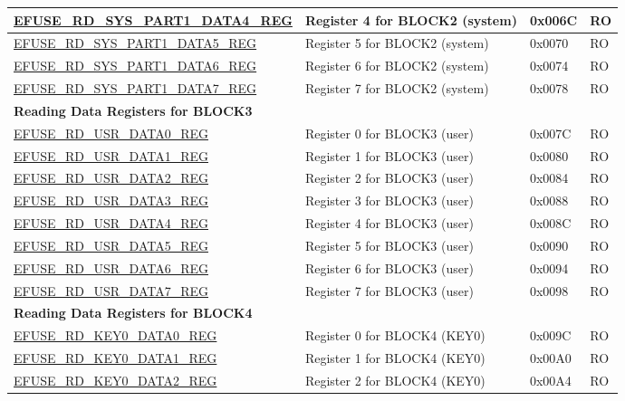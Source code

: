 \begin{longtable}{ | p{7.2cm} | p{6cm} | p{1.3cm} | p{1cm} | }
\hyperref[regdesc:EFUSERDSYSPART1DATA4TO7REG]{EFUSE\_RD\_SYS\_PART1\_DATA4\_REG} & Register 4 for BLOCK2 (system) & 0x006C & RO \\ \hline
\hyperref[regdesc:EFUSERDSYSPART1DATA4TO7REG]{EFUSE\_RD\_SYS\_PART1\_DATA5\_REG} & Register 5 for BLOCK2 (system) & 0x0070 & RO \\ \hline
\hyperref[regdesc:EFUSERDSYSPART1DATA4TO7REG]{EFUSE\_RD\_SYS\_PART1\_DATA6\_REG} & Register 6 for BLOCK2 (system) & 0x0074 & RO \\ \hline
\hyperref[regdesc:EFUSERDSYSPART1DATA4TO7REG]{EFUSE\_RD\_SYS\_PART1\_DATA7\_REG} & Register 7 for BLOCK2 (system) & 0x0078 & RO \\ \hline
\multicolumn{4}{|l|}{\textbf{Reading Data Registers for BLOCK3}} \\ \hline
\hyperref[regdesc:EFUSERDUSRDATANREG]{EFUSE\_RD\_USR\_DATA0\_REG} & Register 0 for BLOCK3 (user) & 0x007C & RO \\ \hline
\hyperref[regdesc:EFUSERDUSRDATANREG]{EFUSE\_RD\_USR\_DATA1\_REG} & Register 1 for BLOCK3 (user) & 0x0080 & RO \\ \hline
\hyperref[regdesc:EFUSERDUSRDATANREG]{EFUSE\_RD\_USR\_DATA2\_REG} & Register 2 for BLOCK3 (user) & 0x0084 & RO \\ \hline
\hyperref[regdesc:EFUSERDUSRDATANREG]{EFUSE\_RD\_USR\_DATA3\_REG} & Register 3 for BLOCK3 (user) & 0x0088 & RO \\ \hline
\hyperref[regdesc:EFUSERDUSRDATANREG]{EFUSE\_RD\_USR\_DATA4\_REG} & Register 4 for BLOCK3 (user) & 0x008C & RO \\ \hline
\hyperref[regdesc:EFUSERDUSRDATANREG]{EFUSE\_RD\_USR\_DATA5\_REG} & Register 5 for BLOCK3 (user) & 0x0090 & RO \\ \hline
\hyperref[regdesc:EFUSERDUSRDATANREG]{EFUSE\_RD\_USR\_DATA6\_REG} & Register 6 for BLOCK3 (user) & 0x0094 & RO \\ \hline
\hyperref[regdesc:EFUSERDUSRDATANREG]{EFUSE\_RD\_USR\_DATA7\_REG} & Register 7 for BLOCK3 (user) & 0x0098 & RO \\ \hline
\multicolumn{4}{|l|}{\textbf{Reading Data Registers for BLOCK4}} \\ \hline
\hyperref[regdesc:EFUSERDKEY0DATANREG]{EFUSE\_RD\_KEY0\_DATA0\_REG} & Register 0 for BLOCK4 (KEY0) & 0x009C & RO \\ \hline
\hyperref[regdesc:EFUSERDKEY0DATANREG]{EFUSE\_RD\_KEY0\_DATA1\_REG} & Register 1 for BLOCK4 (KEY0) & 0x00A0 & RO \\ \hline
\hyperref[regdesc:EFUSERDKEY0DATANREG]{EFUSE\_RD\_KEY0\_DATA2\_REG} & Register 2 for BLOCK4 (KEY0) & 0x00A4 & RO \\ \hline

\end{longtable}
